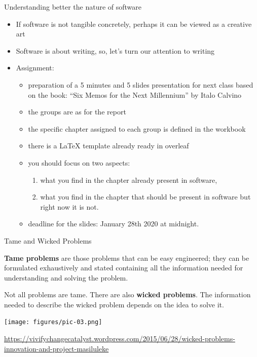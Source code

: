 \documentclass{beamer}
\begin{document}
\begin{frame}{\centerline{Understanding better the nature of software}}
\begin{itemize}
\item If software is not tangible concretely, perhaps it can be viewed as a creative art
\item Software is about writing, so, let's turn our attention to writing
\item Assignment: 
\begin{itemize}
\item preparation of a 5 minutes and 5 slides presentation for next class based on the book: ``Six Memos for the Next Millennium'' by Italo Calvino
\item the groups are as for the report
\item the specific chapter assigned to each group is defined in the workbook
\item there is a LaTeX template already ready in overleaf
\item you should focus on two aspects:
\begin{enumerate}
\item what you find in the chapter already present in software,
\item what you find in the chapter that should be present in software but right now it is not.
\end{enumerate}
\item deadline for the slides: January 28th 2020 at midnight.
\end{itemize}
\end{itemize}

\end{frame}




\begin{frame}{\centerline{Tame and Wicked Problems}}
\begin{small}
\textbf{Tame problems} are those problems that can be easy engineered; they can be formulated exhaustively and stated containing all the information needed for understanding and solving the problem.

Not all problems are tame. There are also \textbf{wicked problems}. The information needed to describe the wicked problem depends on the idea to solve it.

\begin{center}
\texttt{[image: figures/pic-03.png]}
\end{center}

\end{small}

\begin{center}
\tiny
\url{https://vivifychangecatalyst.wordpress.com/2015/06/28/wicked-problems-innovation-and-project-masiluleke}

\end{center}


\end{frame}
\end{document}
